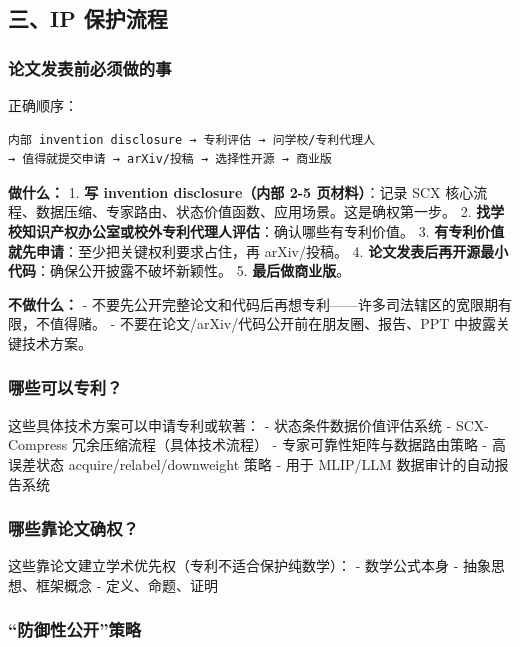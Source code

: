 \documentclass[
  12pt,
]{ctexart}
\begin{document}
\subsection{三、IP 保护流程}\label{ux4e09ip-ux4fddux62a4ux6d41ux7a0b}

\subsubsection{论文发表前必须做的事}\label{ux8bbaux6587ux53d1ux8868ux524dux5fc5ux987bux505aux7684ux4e8b}

正确顺序：

\begin{verbatim}
内部 invention disclosure → 专利评估 → 问学校/专利代理人
→ 值得就提交申请 → arXiv/投稿 → 选择性开源 → 商业版
\end{verbatim}

\textbf{做什么：} 1. \textbf{写 invention disclosure（内部 2-5
页材料）}：记录 SCX
核心流程、数据压缩、专家路由、状态价值函数、应用场景。这是确权第一步。
2.
\textbf{找学校知识产权办公室或校外专利代理人评估}：确认哪些有专利价值。
3. \textbf{有专利价值就先申请}：至少把关键权利要求占住，再 arXiv/投稿。
4. \textbf{论文发表后再开源最小代码}：确保公开披露不破坏新颖性。 5.
\textbf{最后做商业版}。

\textbf{不做什么：} -
不要先公开完整论文和代码后再想专利------许多司法辖区的宽限期有限，不值得赌。
- 不要在论文/arXiv/代码公开前在朋友圈、报告、PPT 中披露关键技术方案。

\subsubsection{哪些可以专利？}\label{ux54eaux4e9bux53efux4ee5ux4e13ux5229}

这些具体技术方案可以申请专利或软著： - 状态条件数据价值评估系统 -
SCX-Compress 冗余压缩流程（具体技术流程） - 专家可靠性矩阵与数据路由策略
- 高误差状态 acquire/relabel/downweight 策略 - 用于 MLIP/LLM
数据审计的自动报告系统

\subsubsection{哪些靠论文确权？}\label{ux54eaux4e9bux9760ux8bbaux6587ux786eux6743}

这些靠论文建立学术优先权（专利不适合保护纯数学）： - 数学公式本身 -
抽象思想、框架概念 - 定义、命题、证明

\subsubsection{``防御性公开''策略}\label{ux9632ux5fa1ux6027ux516cux5f00ux7b56ux7565}
\end{document}
